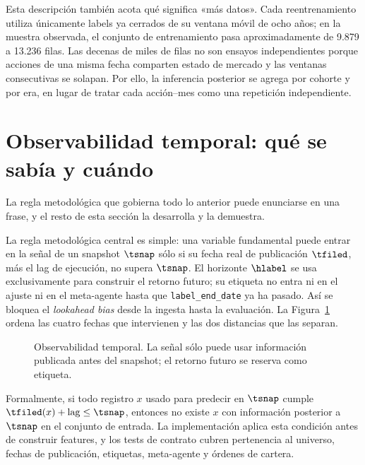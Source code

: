 Esta descripción también acota qué significa «más datos». Cada reentrenamiento utiliza únicamente
labels ya cerrados de su ventana móvil de ocho años; en la muestra observada, el conjunto de
entrenamiento pasa aproximadamente de 9.879 a 13.236 filas. Las decenas de miles de filas no son
ensayos independientes porque acciones de una misma fecha comparten estado de mercado y las
ventanas consecutivas se solapan. Por ello, la inferencia posterior se agrega por cohorte y por era,
en lugar de tratar cada acción--mes como una repetición independiente.

\section{Observabilidad temporal: qué se sabía y cuándo}
\label{sec:observabilidad}

La regla metodológica que gobierna todo lo anterior puede enunciarse en una frase, y el resto de
esta sección la desarrolla y la demuestra.

La regla metodológica central es simple: una variable fundamental puede entrar en la señal de un
snapshot \(\tsnap\) sólo si su fecha real de publicación \(\tfiled\), más el lag de ejecución, no
supera \(\tsnap\). El horizonte \(\hlabel\) se usa exclusivamente para construir el retorno futuro;
su etiqueta no entra ni en el ajuste ni en el meta-agente hasta que \texttt{label\_end\_date} ya ha
pasado. Así se bloquea el \textit{lookahead bias} desde la ingesta hasta la evaluación. La
Figura~\ref{fig:observabilidad} ordena las cuatro fechas que intervienen y las dos distancias que
las separan.

\begin{figure}[H]
\centering
{}
\caption{Observabilidad temporal. La señal sólo puede usar información publicada antes del
snapshot; el retorno futuro se reserva como etiqueta.}
\label{fig:observabilidad}
\end{figure}

Formalmente, si todo registro $x$ usado para predecir en \(\tsnap\) cumple
\(\tfiled(x)+\mathrm{lag}\leq\tsnap\), entonces no existe $x$ con información posterior a
\(\tsnap\) en el conjunto de entrada. La implementación aplica esta condición antes de construir
features, y los tests de contrato cubren pertenencia al universo, fechas de publicación, etiquetas,
meta-agente y órdenes de cartera.

